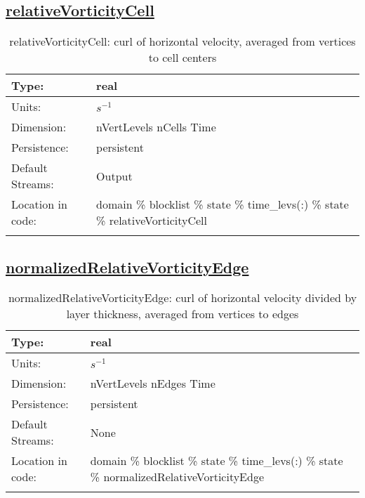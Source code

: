\subsection[relativeVorticityCell]{\hyperref[sec:var_tab_state]{relativeVorticityCell}}
\label{subsec:var_sec_state_relativeVorticityCell}
\begin{center}
\begin{longtable}{| p{2.0in} | p{4.0in} |}
        \hline 
        Type: & real \\
        \hline 
        Units: & $s^{-1}$ \\
        \hline 
        Dimension: & nVertLevels nCells Time \\
        \hline 
        Persistence: & persistent \\
        \hline 
		 Default Streams: & Output  \\
        \hline 
		 Location in code: & domain \% blocklist \% state \% time\_levs(:) \% state \% relativeVorticityCell \\
		 \hline 
    \caption{relativeVorticityCell: curl of horizontal velocity, averaged from vertices to cell centers}
\end{longtable}
\end{center}
\subsection[normalizedRelativeVorticityEdge]{\hyperref[sec:var_tab_state]{normalizedRelativeVorticityEdge}}
\label{subsec:var_sec_state_normalizedRelativeVorticityEdge}
\begin{center}
\begin{longtable}{| p{2.0in} | p{4.0in} |}
        \hline 
        Type: & real \\
        \hline 
        Units: & $s^{-1}$ \\
        \hline 
        Dimension: & nVertLevels nEdges Time \\
        \hline 
        Persistence: & persistent \\
        \hline 
		 Default Streams: & None \\
        \hline 
		 Location in code: & domain \% blocklist \% state \% time\_levs(:) \% state \% normalizedRelativeVorticityEdge \\
		 \hline 
    \caption{normalizedRelativeVorticityEdge: curl of horizontal velocity divided by layer thickness, averaged from vertices to edges}
\end{longtable}
\end{center}
